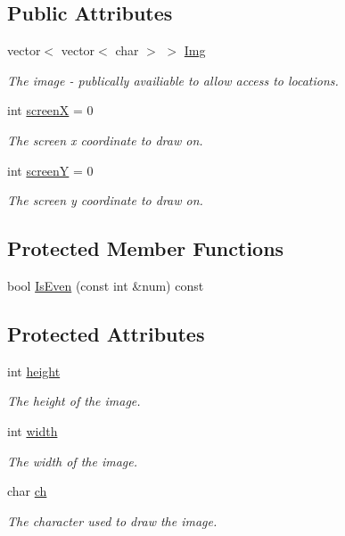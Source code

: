 \subsection*{Public Attributes}
\begin{DoxyCompactItemize}
\item 
vector$<$ vector$<$ char $>$ $>$ \hyperlink{classImage_ac3bad7d8544990b7be9e9c5ee0fb26b8}{Img}
\begin{DoxyCompactList}\small\item\em The image -\/ publically availiable to allow access to locations. \end{DoxyCompactList}\item 
int \hyperlink{classImage_a0488098c125477f82fc6ca8e14cc170f}{screen\-X} = 0
\begin{DoxyCompactList}\small\item\em The screen x coordinate to draw on. \end{DoxyCompactList}\item 
int \hyperlink{classImage_a4c5bb89eba006c3768c2f36ef54d2c5b}{screen\-Y} = 0
\begin{DoxyCompactList}\small\item\em The screen y coordinate to draw on. \end{DoxyCompactList}\end{DoxyCompactItemize}
\subsection*{Protected Member Functions}
\begin{DoxyCompactItemize}
\item 
bool \hyperlink{classImage_aa723637c3d64e1290dbfc67238321413}{Is\-Even} (const int \&num) const 
\end{DoxyCompactItemize}
\subsection*{Protected Attributes}
\begin{DoxyCompactItemize}
\item 
int \hyperlink{classImage_a51df43db420c9c0b57536cb2dd36de5c}{height}
\begin{DoxyCompactList}\small\item\em The height of the image. \end{DoxyCompactList}\item 
int \hyperlink{classImage_ab8d12f635013c04159cd4d3d972bac88}{width}
\begin{DoxyCompactList}\small\item\em The width of the image. \end{DoxyCompactList}\item 
char \hyperlink{classImage_a2d2bff881014df332b1086483d0eb0e9}{ch}
\begin{DoxyCompactList}\small\item\em The character used to draw the image. \end{DoxyCompactList}\end{DoxyCompactItemize}


